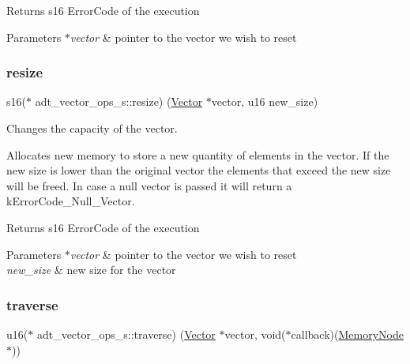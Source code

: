 \begin{DoxyReturn}{Returns}
s16 Error\+Code of the execution 
\end{DoxyReturn}

\begin{DoxyParams}{Parameters}
{\em $\ast$vector} & pointer to the vector we wish to reset \\
\hline
\end{DoxyParams}
\mbox{\label{structadt__vector__ops__s_ac27cca0cff8293eea0496d27b06875ec}} 
\subsubsection{\texorpdfstring{resize}{resize}}
{\footnotesize\ttfamily s16($\ast$ adt\+\_\+vector\+\_\+ops\+\_\+s\+::resize) (\hyperlink{structadt__vector__s}{Vector} $\ast$vector, u16 new\+\_\+size)}



Changes the capacity of the vector. 

Allocates new memory to store a new quantity of elements in the vector. If the new size is lower than the original vector the elements that exceed the new size will be freed. In case a null vector is passed it will return a k\+Error\+Code\+\_\+\+Null\+\_\+\+Vector.

\begin{DoxyReturn}{Returns}
s16 Error\+Code of the execution 
\end{DoxyReturn}

\begin{DoxyParams}{Parameters}
{\em $\ast$vector} & pointer to the vector we wish to reset \\
\hline
{\em new\+\_\+size} & new size for the vector \\
\hline
\end{DoxyParams}
\mbox{\label{structadt__vector__ops__s_a3320a26f63541f7421e6234b4020b0d4}} 
\subsubsection{\texorpdfstring{traverse}{traverse}}
{\footnotesize\ttfamily u16($\ast$ adt\+\_\+vector\+\_\+ops\+\_\+s\+::traverse) (\hyperlink{structadt__vector__s}{Vector} $\ast$vector, void($\ast$callback)(\hyperlink{structmemory__node__s}{Memory\+Node} $\ast$))}



